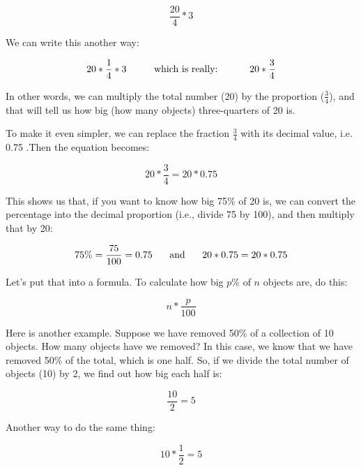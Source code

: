 \documentclass[../../../main.tex]{subfiles}
\begin{document}
\begin{equation*}
  \frac{20}{4} * 3
\end{equation*}

\noindent
We can write this another way:

\begin{equation*}
  20 * \frac{1}{4} * 3 \hskip 1cm \text{which is really: } \hskip 1cm 20 * \frac{3}{4}
\end{equation*}

\noindent
In other words, we can multiply the total number (20) by the proportion ($\frac{3}{4}$), and that will tell us how big (how many objects) three-quarters of 20 is.

To make it even simpler, we can replace the fraction $\frac{3}{4}$ with its decimal value, i.e. 0.75 .Then the equation becomes:

\begin{equation*}
  20 * \frac{3}{4} = 20 * 0.75
\end{equation*}

\noindent
This shows us that, if you want to know how big 75\% of 20 is, we can convert the percentage into the decimal proportion (i.e., divide 75 by 100), and then multiply that by 20:

\begin{equation*}
  75\% = \frac{75}{100} = 0.75 \hskip 0.5cm \text{ and } \hskip 0.5cm 20 * 0.75 = 20 * 0.75
\end{equation*}

\noindent
Let's put that into a formula. To calculate how big $p$\% of $n$ objects are, do this:

\begin{equation*}
  n * \frac{p}{100}
\end{equation*}

\noindent
Here is another example. Suppose we have removed 50\% of a collection of 10 objects. How many objects have we removed? In this case, we know that we have removed 50\% of the total, which is one half. So, if we divide the total number of objects (10) by 2, we find out how big each half is:

\begin{equation*}
  \frac{10}{2} = 5
\end{equation*}

\noindent
Another way to do the same thing:

\begin{equation*}
  10 * \frac{1}{2} = 5
\end{equation*}
\end{document}
